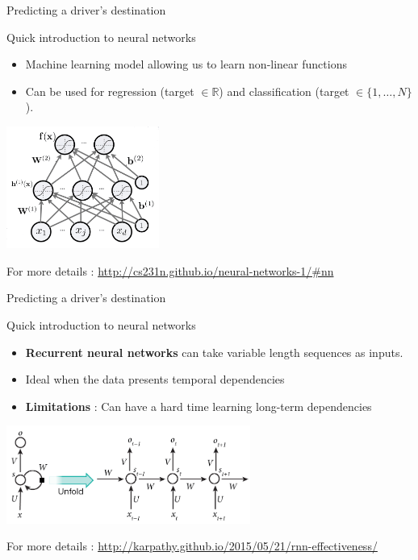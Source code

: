 \documentclass[aspectratio=169]{beamer}
\begin{document}
\begin{frame}{Predicting a driver's destination}

{\Large Quick introduction to neural networks}

\begin{itemize}
	\item Machine learning model allowing us to learn non-linear functions
	\item Can be used for regression (target $\in \mathbb{R}$) and classification (target $\in \{1, \dots, N\}$).
\end{itemize}
\centering
\includegraphics[height=4cm]{figures/nn}

For more details : \url{http://cs231n.github.io/neural-networks-1/#nn}

\end{frame}

\begin{frame}{Predicting a driver's destination}

{\Large Quick introduction to neural networks}

\begin{itemize}
	\item \textbf{Recurrent neural networks} can take variable length sequences as inputs.
	\item Ideal when the data presents temporal dependencies
	\item \textbf{Limitations} : Can have a hard time learning long-term dependencies
\end{itemize}
\centering
\includegraphics[width=0.6\textwidth]{figures/rnn}

For more details : \url{http://karpathy.github.io/2015/05/21/rnn-effectiveness/}

\end{frame}
\end{document}
